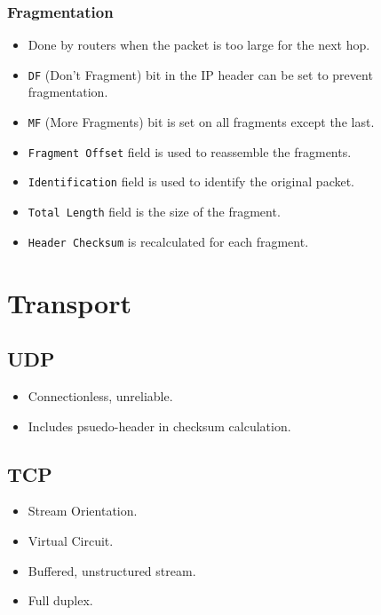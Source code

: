 \documentclass[8pt]{extarticle}
\begin{document}
\subsubsection*{Fragmentation}
\begin{itemize}
  \item Done by routers when the packet is too large for the next hop.
  \item \texttt{DF} (Don't Fragment) bit in the IP header can be set to prevent fragmentation.
  \item \texttt{MF} (More Fragments) bit is set on all fragments except the last.
  \item \texttt{Fragment Offset} field is used to reassemble the fragments.
  \item \texttt{Identification} field is used to identify the original packet.
  \item \texttt{Total Length} field is the size of the fragment.
  \item \texttt{Header Checksum} is recalculated for each fragment.
\end{itemize}

\section*{Transport}
\begin{multicols}{2}
  \subsection*{UDP}
  \begin{itemize}
    \item Connectionless, unreliable.
    \item Includes psuedo-header in checksum calculation.
  \end{itemize}

  \columnbreak

  \subsection*{TCP}
  \begin{itemize}
    \item Stream Orientation.
    \item Virtual Circuit.
    \item Buffered, unstructured stream.
    \item Full duplex.
  \end{itemize}
\end{multicols}
\end{document}
